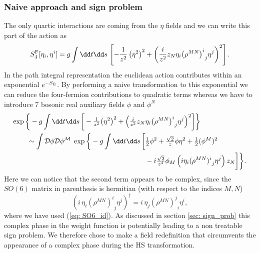 \subsubsection{Naive approach and sign problem}
The only quartic interactions are coming from the $\eta$ fields and we can write this part of the action as
%
%
\begin{equation}
S^{\rm F}_{4} [\eta_{i},\eta^{i}] = g \int \dd t \dd s \, \left[-\frac{1}{z^{2}}\left(\eta^{2}\right)^{2} + \left(\frac{i}{z^{2}}z_{N}
\eta_{i}{\left(\rho^{MN}\right)^{i}}_{j}\eta^{j}\right)^{2} \right].
\label{eqq: S_4}
\end{equation}
%
%
In the path integral representation the euclidean action contributes within an exponential $e^{-S_{\rm E}}$. By performing a naive  transformation to this exponential we can reduce the four-fermion contributions to quadratic  terms whereas we have to introduce 7 bosonic real auxiliary fields $\phi$ and $\phi^{N}$
%
%
\begin{align}
\exp \bigg\lbrace -g \int \dd t \dd s \, \bigg[-\tfrac{1}{z^{2}} \big(\eta^{2}\big)^{2} + \Big(\tfrac{i}{z^{2}}z_{N}
& \eta_{i}{\big(\rho^{MN}\big)^{i}}_{j}\eta^{j}\Big)^{2} \bigg] \bigg\rbrace \\
%
%
\sim \int \mathcal{D}\phi \mathcal{D}\mathcal{\phi^{M}}\; \exp\bigg\lbrace -g \int \dd t \dd s \, \bigg[ &\tfrac{1}{2}\phi^{2} + \tfrac{\sqrt{2}}{z}\phi\eta^{2} +\tfrac{1}{2} (\phi^{M})^{2} \notag \\
 &- i\tfrac{\sqrt{2}}{z^{4}} \phi_{M} \left( i\eta_{i}{(\rho^{MN})^{i}}_{j}\eta^{j}\right) z_{N} \bigg] \bigg\rbrace. \notag
\end{align}
%
%
Here we can notice that the second term appears to be complex, since the $SO(6)$ matrix in parenthesis is hermitian (with respect to the indices $M,N$)
%
%
\begin{equation}
\left( i \,\eta_{i} {\left(\rho^{MN}\right)^{i}}_{j}\eta^{j}\right)^{\dagger} = i\, \eta_{j} {\left(\rho^{MN}\right)^{j}}_{i}\eta^{i},
\end{equation}
%
%
where we have used (\ref{eq: SO6_id}). As discussed in section \ref{sec: sign_prob} this complex phase in the weight function is potentially leading to a non treatable sign problem. We therefore chose to make a field redefinition that circumvents the appearance of a complex phase during the HS transformation. 
%
%
%
%
%
%

